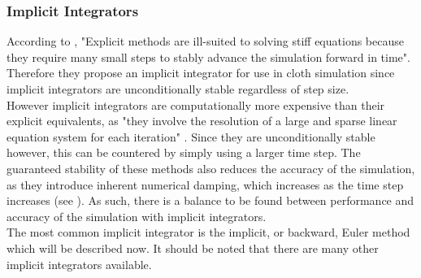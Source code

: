 \subsubsection{Implicit Integrators}
According to \textcite[1]{Baraff1998}, "Explicit methods are ill-suited to solving stiff equations because they require many small steps to stably advance the simulation forward in time". Therefore they propose an implicit integrator for use in cloth simulation since implicit integrators are unconditionally stable regardless of step size. 
\\However implicit integrators are computationally more expensive than their explicit equivalents, as "they involve the resolution of a large and sparse linear equation system for each iteration" \parencite[4]{Volino2005}. Since they are unconditionally stable however, this can be countered by simply using a larger time step. The guaranteed stability of these methods also reduces the accuracy of the simulation, as they introduce inherent numerical damping, which increases as the time step increases (see \textcite[4]{Volino2001}). As such, there is a balance to be found between performance and accuracy of the simulation with implicit integrators.
\\The most common implicit integrator is the implicit, or backward, Euler method which will be described now. It should be noted that there are many other implicit integrators available.

